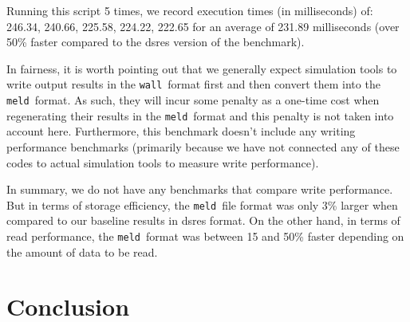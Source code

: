 \documentclass[11pt,a4paper,twocolumn]{article}
\newcommand{\wall}{\texttt{wall}}
\newcommand{\meld}{\texttt{meld}}
\begin{document}
Running this script 5 times, we record execution times (in
milliseconds) of: 246.34, 240.66, 225.58, 224.22, 222.65 for an
average of 231.89 milliseconds (over 50\% faster compared to the dsres
version of the benchmark).

In fairness, it is worth pointing out that we generally expect
simulation tools to write output results in the \wall\ format first
and then convert them into the \meld\ format.  As such, they will
incur some penalty as a one-time cost when regenerating their results
in the \meld\ format and this penalty is not taken into account here.
Furthermore, this benchmark doesn't include any writing performance
benchmarks (primarily because we have not connected any of these codes
to actual simulation tools to measure write performance).

In summary, we do not have any benchmarks that compare write
performance.  But in terms of storage efficiency, the \meld\ file
format was only 3\% larger when compared to our baseline results in
dsres format.  On the other hand, in terms of read performance, the
\meld\ format was between 15 and 50\% faster depending on the amount
of data to be read.

\section{Conclusion}
\label{sec:conclusion}
\end{document}
